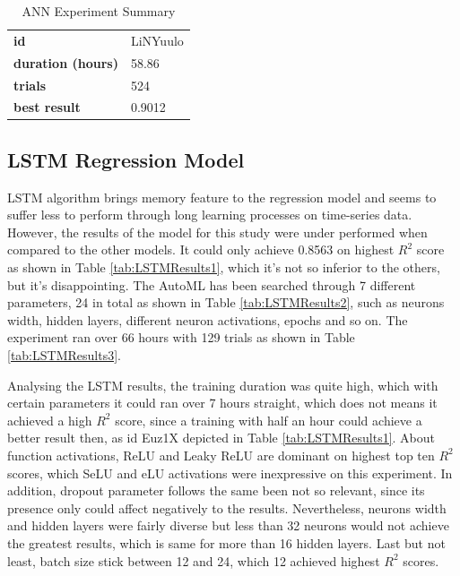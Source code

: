\begin{table}[!htpb]
\small
\centering
\caption{ANN Experiment Summary}
\label{tab:ANNresults2}
\begin{tabular}{ll} \hline
\textbf{id} & LiNYuulo \\
\textbf{duration (hours)} & 58.86 \\
\textbf{trials} & 524 \\
\textbf{best result} & 0.9012 \\ \hline
\end{tabular}
\end{table}




\subsection{LSTM Regression Model}

LSTM algorithm brings memory feature to the regression model and seems to suffer less to perform through long learning processes on time-series data. However, the results of the model for this study were under performed when compared to the other models. It could only achieve 0.8563 on highest $R^2$ score as shown in Table \ref{tab:LSTMResults1}, which it's not so inferior to the others, but it's disappointing. The AutoML has been searched through 7 different parameters, 24 in total as shown in Table \ref{tab:LSTMResults2}, such as neurons width, hidden layers, different neuron activations, epochs and so on. The experiment ran over 66 hours with 129 trials as shown in Table \ref{tab:LSTMResults3}.

Analysing the LSTM results, the training duration was quite high, which with certain parameters it could ran over 7 hours straight, which does not means it achieved a high $R^2$ score, since a training with half an hour could achieve a better result then, as id Euz1X depicted in Table \ref{tab:LSTMResults1}. About function activations, ReLU and Leaky ReLU are dominant on highest top ten $R^2$ scores, which SeLU and eLU activations were inexpressive on this experiment. In addition, dropout parameter follows the same been not so relevant, since its presence only could affect negatively to the results. Nevertheless, neurons width and hidden layers were fairly diverse but less than 32 neurons would not achieve the greatest results, which is same for more than 16 hidden layers. Last but not least, batch size stick between 12 and 24, which 12 achieved highest $R^2$ scores.


